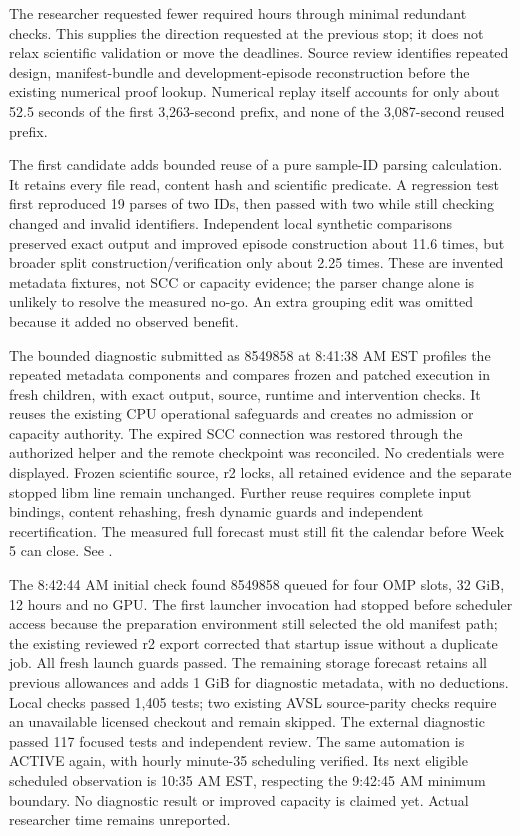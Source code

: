 The researcher requested fewer required hours through minimal redundant checks.
This supplies the direction requested at the previous stop; it does not relax
scientific validation or move the deadlines. Source review identifies repeated
design, manifest-bundle and development-episode reconstruction before the existing
numerical proof lookup. Numerical replay itself accounts for only about 52.5
seconds of the first 3,263-second prefix, and none of the 3,087-second reused prefix.

The first candidate adds bounded reuse of a pure sample-ID parsing calculation.
It retains every file read, content hash and scientific predicate. A regression
test first reproduced 19 parses of two IDs, then passed with two while still
checking changed and invalid identifiers. Independent local synthetic comparisons
preserved exact output and improved episode construction about 11.6 times, but
broader split construction/verification only about 2.25 times. These are invented
metadata fixtures, not SCC or capacity evidence; the parser change alone is
unlikely to resolve the measured no-go. An extra grouping edit was omitted
because it added no observed benefit.

The bounded diagnostic submitted as 8549858 at 8:41:38 AM EST profiles the repeated
metadata components and compares frozen and patched execution in fresh children, with exact output,
source, runtime and intervention checks. It reuses the existing CPU operational
safeguards and creates no admission or capacity authority. The expired SCC
connection was restored through the authorized helper and the remote checkpoint
was reconciled. No credentials were displayed. Frozen scientific source, r2 locks,
all retained evidence and the separate stopped libm line remain unchanged.
Further reuse requires complete input bindings, content rehashing, fresh dynamic
guards and independent recertification. The measured full forecast must still fit
the calendar before Week 5 can close. See .

The 8:42:44 AM initial check found 8549858 queued for four OMP slots, 32 GiB,
12 hours and no GPU. The first launcher invocation had stopped before scheduler
access because the preparation environment still selected the old manifest path;
the existing reviewed r2 export corrected that startup issue without a duplicate
job. All fresh launch guards passed. The remaining storage forecast retains all
previous allowances and adds 1 GiB for diagnostic metadata, with no deductions.
Local checks passed 1,405 tests; two existing AVSL source-parity checks require an
unavailable licensed checkout and remain skipped. The external diagnostic passed
117 focused tests and independent review. The same automation is ACTIVE again,
with hourly minute-35 scheduling verified. Its next eligible scheduled observation
is 10:35 AM EST, respecting the 9:42:45 AM minimum boundary. No diagnostic result
or improved capacity is claimed yet. Actual researcher time remains unreported.

